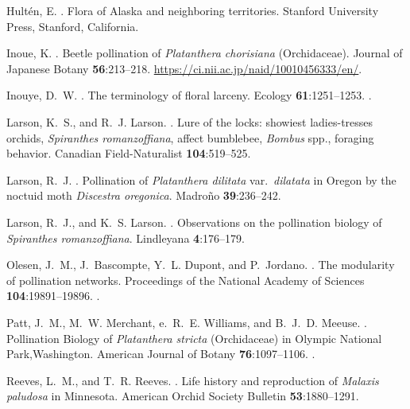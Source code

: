 \begin{multicols}{2}
\begin{thebibliography}{28}
Hultén, E.
.
\newblock Flora of {Alaska} and neighboring territories.
\newblock Stanford University Press, Stanford, California.

Inoue, K.
.
\newblock Beetle pollination of \emph{Platanthera chorisiana} (Orchidaceae).
\newblock Journal of Japanese Botany {\bfseries 56}:213--218.
\newblock \urlprefix\url{https://ci.nii.ac.jp/naid/10010456333/en/}.

Inouye, D.~W.
.
\newblock The terminology of floral larceny.
\newblock Ecology {\bfseries 61}:1251--1253.
\newblock {}.

Larson, K.~S., and R.~J. Larson.
.
\newblock Lure of the locks: showiest ladies-tresses orchids, \emph{Spiranthes
  romanzoffiana}, affect bumblebee, \emph{Bombus} spp., foraging behavior.
\newblock Canadian Field-Naturalist {\bfseries 104}:519--525.

Larson, R.~J.
.
\newblock Pollination of \emph{Platanthera dilitata} var.\ \emph{dilatata} in
  {Oregon} by the noctuid moth \emph{Discestra oregonica}.
\newblock Madro\~{n}o {\bfseries 39}:236--242.

Larson, R.~J., and K.~S. Larson.
.
\newblock Observations on the pollination biology of \emph{Spiranthes
  romanzoffiana}.
\newblock Lindleyana {\bfseries 4}:176--179.

Olesen, J.~M., J.~Bascompte, Y.~L. Dupont, and P.~Jordano.
.
\newblock The modularity of pollination networks.
\newblock Proceedings of the National Academy of Sciences {\bfseries
  104}:19891--19896.
\newblock {}.

Patt, J.~M., M.~W. Merchant, e.~R.~E. Williams, and B.~J.~D. Meeuse.
.
\newblock Pollination Biology of \emph{Platanthera stricta} (Orchidaceae) in
  Olympic National Park,Washington.
\newblock American Journal of Botany {\bfseries 76}:1097--1106.
\newblock {}.

Reeves, L.~M., and T.~R. Reeves.
.
\newblock Life history and reproduction of \emph{Malaxis paludosa} in
  Minnesota.
\newblock American Orchid Society Bulletin {\bfseries 53}:1880--1291.


\end{thebibliography}
\end{multicols}
